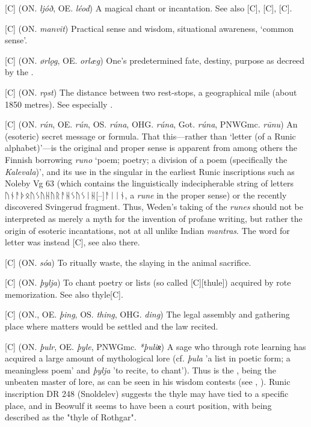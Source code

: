 \begin{itemize}
[C] (ON. \emph{ljóð}, OE. \emph{léod})
  A magical chant or incantation. See also [C], [C], [C].

[C] (ON. \emph{manvit})
  Practical sense and wisdom, situational awareness, ‘common sense’.

[C] (ON. \emph{ørlǫg}, OE. \emph{orlæg})
  One’s predetermined fate, destiny, purpose as decreed by the .

[C] (ON. \emph{rǫst})
  The distance between two rest-stops, a geographical mile (about 1850 metres). See especially \CV.

[C] (ON. \emph{rún}, OE. \emph{rún}, OS. \emph{rúna}, OHG. \emph{rúna}, Got. \emph{rúna}, PNWGmc. \emph{rūnu})
  An (esoteric) secret message or formula. That this—rather than ‘letter (of a Runic alphabet)’—is the original and proper sense is apparent from among others the Finnish borrowing \emph{runo} ‘poem; poetry; a division of a poem (specifically the \emph{Kalevala})’, and its use in the singular in the earliest Runic inscriptions such as Noleby Vg 63 (which contains the linguistically indecipherable string of letters ᚢᚾᚨᚦᛟᚢᛊᚢᚺᚢᚱᚨᚺᛊᚢᛊᛁᚺ[--]ᚨᛁᛁᚾ, a \emph{rune} in the proper sense) or the recently discovered Svingerud fragment. Thus, Weden’s taking of the \emph{runes} should not be interpreted as merely a myth for the invention of profane writing, but rather the origin of esoteric incantations, not at all unlike Indian \emph{mantras}.
  The word for letter was instead [C], see also there.

[C] (ON. \emph{sóa})
  To ritually waste, the slaying in the animal sacrifice.

[C] (ON. \emph{þylja})
  To chant poetry or lists (so called [C][thule]) acquired by rote memorization. See also {thyle}[C].

[C] (ON., OE. \emph{þing}, OS. \emph{thing}, OHG. \emph{ding})
  The legal assembly and gathering place where matters would be settled and the law recited.

[C] (ON. \emph{þulr}, OE. \emph{þyle}, PNWGmc. \emph{*þuliʀ})
  A sage who through rote learning has acquired a large amount of mythological lore (cf. \emph{þula} 'a list in poetic form; a meaningless poem' and \emph{þylja} 'to recite, to chant'). Thus  is the , being the unbeaten master of lore, as can be seen in his wisdom contests (see \Allvismal, \Vafthrudnismal). Runic inscription DR 248 (Snoldelev) suggests the thyle may have tied to a specific place, and in Beowulf it seems to have been a court position, with  being described as the "thyle of Rothgar".


\end{itemize}
